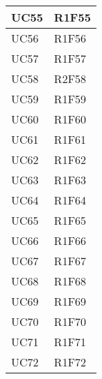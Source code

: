 \begin{center}
\begin{longtable}{|p{44mm}|p{22mm}|}
\\
\hline
UC55 &
R1F55 
\\
\hline
UC56 &
R1F56 
\\
\hline
UC57 &
R1F57 
\\
\hline
UC58 &
R2F58 
\\
\hline
UC59 &
R1F59 
\\
\hline
UC60 &
R1F60 
\\
\hline
UC61 &
R1F61 
\\
\hline
UC62 &
R1F62 
\\
\hline
UC63 &
R1F63 
\\
\hline
UC64 &
R1F64 
\\
\hline
UC65 &
R1F65 
\\
\hline
UC66 &
R1F66 
\\
\hline
UC67 &
R1F67 
\\
\hline
UC68 &
R1F68 
\\
\hline
UC69 &
R1F69 
\\
\hline
UC70 &
R1F70 
\\
\hline
UC71 &
R1F71 
\\
\hline
UC72 &
R1F72 
\\
\hline%
		
	\end{longtable}
\end{center}


